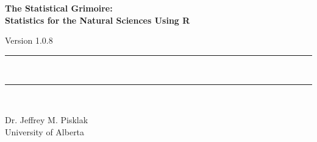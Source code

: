 {}
{
\Huge\bfseries\centering\headingfont The Statistical Grimoire: \\
Statistics for the Natural Sciences Using R\\

\vspace{0.5em}

\small\mdseries\raggedright Version 1.0.8

\rule{\linewidth}{1pt}\\[-6mm]
\rule{\linewidth}{2pt}\\

}

\vskip 2cm

\begin{center}
\Large Dr. Jeffrey M. Pisklak \\
\vspace{0.5em}
\large University of Alberta
\end{center}

\vfill

